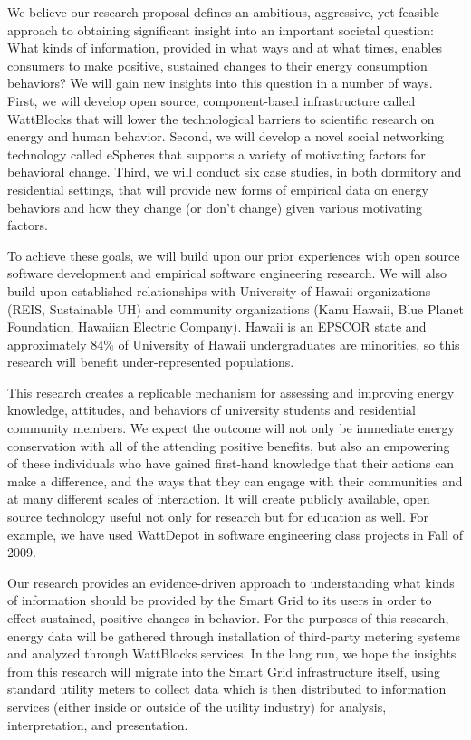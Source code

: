 We believe our research proposal defines an ambitious, aggressive, yet
feasible approach to obtaining significant insight into an important
societal question: What kinds of information, provided in what ways and at
what times, enables consumers to make positive, sustained changes to their
energy consumption behaviors?  We will gain new insights into this question
in a number of ways.  First, we will develop open source, component-based
infrastructure called WattBlocks that will lower the technological barriers
to scientific research on energy and human behavior.  Second, we will
develop a novel social networking technology called eSpheres that supports
a variety of motivating factors for behavioral change.  Third, we will
conduct six case studies, in both dormitory and residential settings, that
will provide new forms of empirical data on energy behaviors and how they
change (or don't change) given various motivating factors.

To achieve these goals, we will build upon our prior experiences with open
source software development and empirical software engineering research. We
will also build upon established relationships with University of Hawaii
organizations (REIS, Sustainable UH) and community organizations (Kanu
Hawaii, Blue Planet Foundation, Hawaiian Electric Company).  Hawaii
is an EPSCOR state and approximately 84\% of University of Hawaii
undergraduates are minorities, so this research will benefit
under-represented populations. 

This research creates a replicable mechanism for assessing and improving
energy knowledge, attitudes, and behaviors of university students and
residential community members. We expect the outcome will not only be
immediate energy conservation with all of the attending positive benefits,
but also an empowering of these individuals who have gained first-hand
knowledge that their actions can make a difference, and the ways that they
can engage with their communities and at many different scales of
interaction.  It will create publicly available, open source technology
useful not only for research but for education as well.  For example, we
have used WattDepot in software engineering class projects in Fall of 2009.

Our research provides an evidence-driven approach to understanding what
kinds of information should be provided by the Smart Grid to its users in
order to effect sustained, positive changes in behavior.  For the purposes
of this research, energy data will be gathered through installation of
third-party metering systems and analyzed through WattBlocks services. In
the long run, we hope the insights from this research will migrate into the Smart
Grid infrastructure itself, using standard utility meters to collect data
which is then distributed to information services (either inside or outside
of the utility industry) for analysis, interpretation, and presentation.

